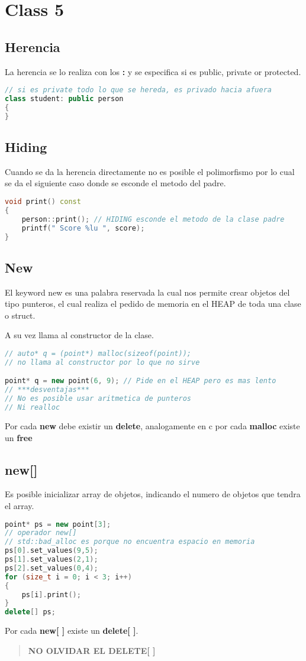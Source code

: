 \documentclass[11pt,letterpaper]{article}
\begin{document}
\section{Class 5}
\subsection{Herencia}
La herencia se lo realiza con los \textbf{:} y se especifica
si es public, private or protected.
\begin{lstlisting}[language=C++, caption={Herencia}]
// si es private todo lo que se hereda, es privado hacia afuera
class student: public person 
{
}
\end{lstlisting}

\subsection{Hiding}
Cuando se da la herencia directamente no es posible el polimorfismo por lo cual
se da el siguiente caso donde se esconde el metodo del padre.
\begin{lstlisting}[language=C++, caption={Hiding}]
void print() const
{
    person::print(); // HIDING esconde el metodo de la clase padre
    printf(" Score %lu ", score);
}
\end{lstlisting}

\subsection{New}
El keyword new es una palabra reservada la cual nos permite crear objetos
del tipo punteros, el cual realiza el pedido de memoria en el HEAP de toda una 
clase o struct. \par
A su vez llama al constructor de la clase. 
\begin{lstlisting}[language=C++, caption={New}]
// auto* q = (point*) malloc(sizeof(point)); 
// no llama al constructor por lo que no sirve

point* q = new point(6, 9); // Pide en el HEAP pero es mas lento
// ***desventajas***
// No es posible usar aritmetica de punteros
// Ni realloc
\end{lstlisting}
Por cada \textbf{new} debe existir un \textbf{delete}, analogamente en c
por cada \textbf{malloc} existe un \textbf{free} 

\subsection{new[]}
Es posible inicializar array de objetos, indicando el numero de objetos que 
tendra el array.
\begin{lstlisting}[language=C++, caption={New[ ]}]
point* ps = new point[3];
// operador new[]
// std::bad_alloc es porque no encuentra espacio en memoria
ps[0].set_values(9,5);
ps[1].set_values(2,1);
ps[2].set_values(0,4);
for (size_t i = 0; i < 3; i++)
{
    ps[i].print();
}
delete[] ps;
\end{lstlisting}
Por cada \textbf{new[ ]} existe un \textbf{delete[ ]}.
\begin{quote}
    \textbf{NO OLVIDAR EL DELETE[ ]}
\end{quote}
\end{document}

